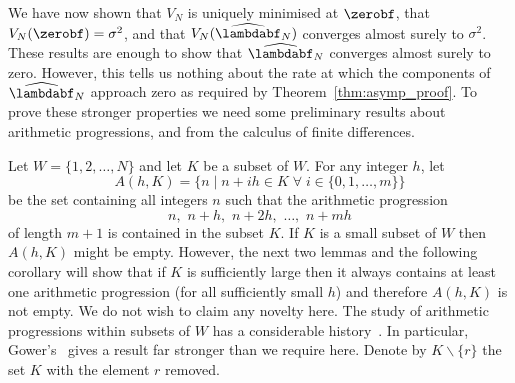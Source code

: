 \documentclass[journal]{IEEEtran}
\begin{document}

We have now shown that $V_N$ is uniquely minimised at $\zerobf$, that $V_N(\zerobf) = \sigma^2$, and that $V_N(\widehat{\lambdabf}_N)$ converges almost surely to $\sigma^2$.  These results are enough to show that $\widehat{\lambdabf}_N$ converges almost surely to zero.  However, this tells us nothing about the rate at which the components of $\widehat{\lambdabf}_N$ approach zero as required by Theorem~\ref{thm:asymp_proof}.  To prove these stronger properties we need some preliminary results about arithmetic progressions, and from the calculus of finite differences.
 
Let $W = \{1,2,\dots, N\}$ and let $K$ be a subset of $W$.  For any integer $h$, let
\begin{equation} \label{eq:S(h,G)def} 
A(h,K) = \big\{ n \mid n + ih \in K \;\forall\; i \in \{0,1,\dots,m\} \big\}
\end{equation}
be the set containing all integers $n$ such that the arithmetic progression
\[
n, \,\, n + h, \,\, n + 2h, \,\, \dots, \,\, n + mh
\]
of length $m+1$ is contained in the subset $K$.  If $K$ is a small subset of $W$ then $A(h,K)$ might be empty. However, the next two lemmas and the following corollary will show that if $K$ is sufficiently large then it always contains at least one arithmetic progression (for all sufficiently small $h$) and therefore $A(h,K)$ is not empty. We do not wish to claim any novelty here.  The study of arithmetic progressions within subsets of $W$ has a considerable history~\cite{Erdos_on_some_sequence_of_integers1936,Szemeredi_setint_no_k_arth1975,Gowers_new_proof2001}.  In particular, Gower's~\cite[Theorem 1.3]{Gowers_new_proof2001} gives a result far stronger than we require here.  Denote by $K \backslash \{r\}$ the set $K$ with the element $r$ removed.
\end{document}
